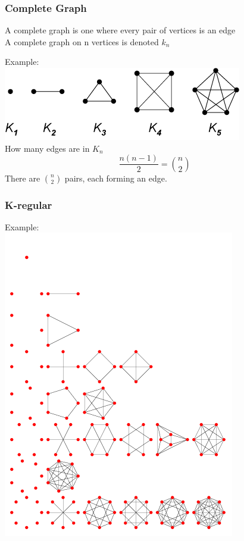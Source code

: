 \documentclass[12pt]{article}
\begin{document}
	\subsubsection*{Complete Graph}
	A complete graph is one where every pair of vertices is an edge\\
	A complete graph on n vertices is denoted $k_n$
	
	Example: \\
	\includegraphics[scale=0.5]{completegraphs.png}\\
	
	How many edges are in $K_n$\\
	$$\frac{n(n-1)}{2} = {n \choose 2}$$
	There are ${n \choose 2}$ pairs, each forming an edge.
	
	\subsubsection*{K-regular}
	Example: \\
	\includegraphics[scale=0.5]{k-regular.png}\\
	
\end{document}
